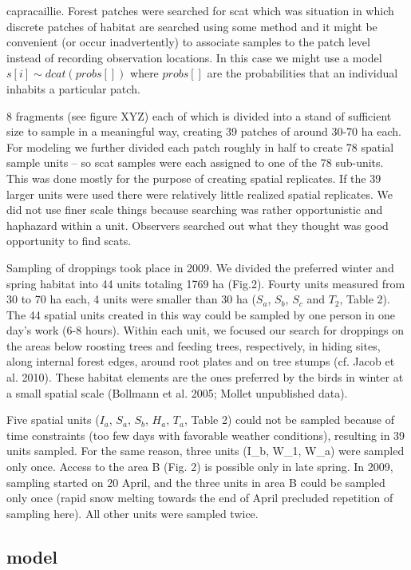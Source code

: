 {capracaillie. Forest patches were searched for scat which was
situation in which discrete patches of habitat are searched using some
method and it might be convenient (or occur inadvertently) to
associate samples to the patch level instead of recording observation
locations. In this case we might use a model $s[i] \sim dcat(probs[])$
where $probs[]$ are the probabilities that an individual inhabits a
particular patch.

8 fragments (see figure XYZ) each of which is divided into a stand of 
sufficient size to sample in a meaningful way, creating 39 patches of around
30-70 ha each. For modeling we further divided each patch roughly in half to
create 78 spatial sample units -- so scat samples were each assigned to one of
the 78 sub-units. This was done mostly for the purpose of creating spatial
replicates. If the 39 larger units were used there were relatively little
realized spatial replicates. 
We did not use finer scale things because searching was rather opportunistic
and haphazard within a unit. Observers searched out what they thought was
good opportunity to find scats.  

Sampling of droppings took place in 2009. We divided the preferred winter 
and spring habitat into 44 units totaling 1769 ha (Fig.2). Fourty units
 measured from 30 to 70 ha each, 4 units were smaller than 30 ha 
 ($S_a$, $S_b$, $S_c$ and $T_2$, Table 2). The 44 spatial units created in this way
  could be sampled by one person in one day's work (6-8 hours). Within 
  each unit, we focused our search for droppings on the areas below 
  roosting trees and feeding trees, respectively, in hiding sites, along internal forest edges, around root plates and on tree stumps (cf. Jacob et al. 2010). These habitat elements are the ones preferred by the birds in winter at a small spatial scale (Bollmann et al. 2005; Mollet unpublished data).

Five spatial units ($I_a$, $S_a$, $S_b$, $H_a$, $T_a$, Table 2) could not be sampled
because of time constraints (too few days with favorable weather conditions),
resulting in 39 units sampled. For the same reason, three units (I_b, W_1,
W_a) were sampled only once. Access to the area B (Fig. 2) is possible only in
late spring. In 2009, sampling started on 20 April, and the three units in
area B could be sampled only once (rapid snow melting towards the end of April
precluded repetition of sampling here). All other units were sampled twice.

\subsection{model}

}
